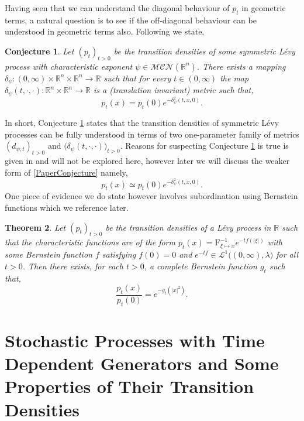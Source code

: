 \documentclass[a4paper, 12pt]{report}
\newtheorem{theorem}{Theorem}[section]
\theoremstyle{cor}
\newtheorem{conj}[theorem]{Conjecture}
\theoremstyle{remark}
\theoremstyle{definition}
\begin{document}
Having seen that we can understand the diagonal behaviour of $p_t$ in geometric terms, a natural question is to see if the off-diagonal behaviour can be understood in geometric terms also.  Following \cite{Paper} we state,
\begin{conj}\label{FAaSGRtLPConj1}
Let $(p_t)_{t > 0}$ be the transition densities of some symmetric L\'evy process with characteristic exponent $\psi \in \mathcal{MCN}(\mathbb{R}^n)$.  There exists a mapping $\delta_\psi : (0, \infty) \times \mathbb{R}^n \times \mathbb{R}^n \to \mathbb{R}$ such that for every $t \in (0, \infty)$ the map $\delta_\psi(t, \cdot, \cdot) : \mathbb{R}^n \times \mathbb{R}^n \to \mathbb{R}$ is a (translation invariant) metric such that,
\begin{equation}\label{PaperConjecture}
p_t(x) = p_t(0)e^{-\delta_\psi^2(t, x, 0)}.
\end{equation}
\end{conj}
In short, Conjecture \ref{FAaSGRtLPConj1} states that the transition densities of symmetric L\'evy processes can be fully understood in terms of two one-parameter family of metrics $(d_{\psi, t})_{t > 0}$ and $\big(\delta_\psi(t, \cdot, \cdot)\big)_{t > 0}$.  Reasons for suspecting Conjecture \ref{FAaSGRtLPConj1} is true is given in \cite{Paper} and will not be explored here, however later we will discuss the weaker form of \eqref{PaperConjecture} namely,
\begin{equation}
p_t(x) \simeq p_t(0)e^{-\delta_\psi^2(t, x, 0)}.
\end{equation}
 One piece of evidence we do state however involves subordination using Bernstein functions which we reference later.
\begin{theorem}\label{TDSGMeT3}
Let $(p_t)_{t > 0}$ be the transition densities of a L\'evy process in $\mathbb{R}$ such that the characteristic functions are of the form $p_t(x) = \mathrm{F}_{\xi \mapsto x}^{-1}e^{-tf(|\xi|)}$ with some Bernstein function $f$ satisfying $f(0) = 0$ and $e^{-tf} \in \mathcal{L}^1\big((0, \infty), \lambda\big)$ for all $t > 0$.  Then there exists, for each $t > 0$, a complete Bernstein function $g_t$ such that,
$$
\frac{p_t(x)}{p_t(0)} = e^{-g_t(|x|^2)}.
$$
\end{theorem}

\newpage

\part{Stochastic Processes with Time Dependent Generators and Some Properties of Their Transition Densities}
\end{document}

